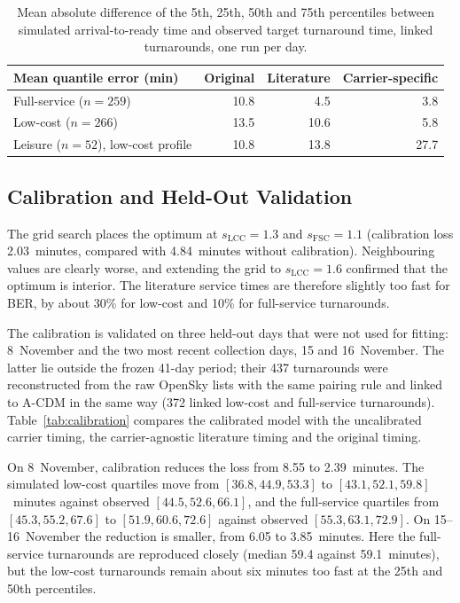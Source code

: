 \begin{table}[htbp]\centering\small
\begin{tabular}{lrrr}\hline
Mean quantile error (min) & Original & Literature & Carrier-specific\\\hline
Full-service ($n=259$) & 10.8 & 4.5 & 3.8\\
Low-cost ($n=266$) & 13.5 & 10.6 & 5.8\\
Leisure ($n=52$), low-cost profile & 10.8 & 13.8 & 27.7\\\hline
\end{tabular}
\caption{Mean absolute difference of the 5th, 25th, 50th and 75th percentiles between simulated arrival-to-ready time and observed target turnaround time, linked turnarounds, one run per day.}
\label{tab:timingconfig}
\end{table}

\subsection{Calibration and Held-Out Validation}
The grid search places the optimum at $s_{\mathrm{LCC}}=1.3$ and $s_{\mathrm{FSC}}=1.1$ (calibration loss 2.03~minutes, compared with 4.84~minutes without calibration). Neighbouring values are clearly worse, and extending the grid to $s_{\mathrm{LCC}}=1.6$ confirmed that the optimum is interior. The literature service times are therefore slightly too fast for BER, by about 30\% for low-cost and 10\% for full-service turnarounds.

The calibration is validated on three held-out days that were not used for fitting: 8~November and the two most recent collection days, 15 and 16~November. The latter lie outside the frozen 41-day period; their 437 turnarounds were reconstructed from the raw OpenSky lists with the same pairing rule and linked to A-CDM in the same way (372 linked low-cost and full-service turnarounds). Table~\ref{tab:calibration} compares the calibrated model with the uncalibrated carrier timing, the carrier-agnostic literature timing and the original timing.

On 8~November, calibration reduces the loss from 8.55 to 2.39~minutes. The simulated low-cost quartiles move from $[36.8, 44.9, 53.3]$ to $[43.1, 52.1, 59.8]$~minutes against observed $[44.5, 52.6, 66.1]$, and the full-service quartiles from $[45.3, 55.2, 67.6]$ to $[51.9, 60.6, 72.6]$ against observed $[55.3, 63.1, 72.9]$. On 15--16~November the reduction is smaller, from 6.05 to 3.85~minutes. Here the full-service turnarounds are reproduced closely (median 59.4 against 59.1~minutes), but the low-cost turnarounds remain about six minutes too fast at the 25th and 50th percentiles.

